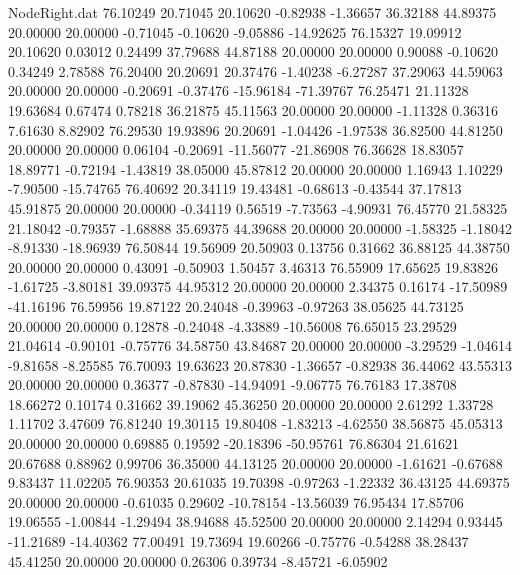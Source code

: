 \begin{filecontents}{NodeRight.dat}
  76.10249   20.71045   20.10620    -0.82938   -1.36657   36.32188   44.89375   20.00000   20.00000   -0.71045   -0.10620   -9.05886  -14.92625
  76.15327   19.09912   20.10620     0.03012    0.24499   37.79688   44.87188   20.00000   20.00000    0.90088   -0.10620    0.34249    2.78588
  76.20400   20.20691   20.37476    -1.40238   -6.27287   37.29063   44.59063   20.00000   20.00000   -0.20691   -0.37476  -15.96184  -71.39767
  76.25471   21.11328   19.63684     0.67474    0.78218   36.21875   45.11563   20.00000   20.00000   -1.11328    0.36316    7.61630    8.82902
  76.29530   19.93896   20.20691    -1.04426   -1.97538   36.82500   44.81250   20.00000   20.00000    0.06104   -0.20691  -11.56077  -21.86908
  76.36628   18.83057   18.89771    -0.72194   -1.43819   38.05000   45.87812   20.00000   20.00000    1.16943    1.10229   -7.90500  -15.74765
  76.40692   20.34119   19.43481    -0.68613   -0.43544   37.17813   45.91875   20.00000   20.00000   -0.34119    0.56519   -7.73563   -4.90931
  76.45770   21.58325   21.18042    -0.79357   -1.68888   35.69375   44.39688   20.00000   20.00000   -1.58325   -1.18042   -8.91330  -18.96939
  76.50844   19.56909   20.50903     0.13756    0.31662   36.88125   44.38750   20.00000   20.00000    0.43091   -0.50903    1.50457    3.46313
  76.55909   17.65625   19.83826    -1.61725   -3.80181   39.09375   44.95312   20.00000   20.00000    2.34375    0.16174  -17.50989  -41.16196
  76.59956   19.87122   20.24048    -0.39963   -0.97263   38.05625   44.73125   20.00000   20.00000    0.12878   -0.24048   -4.33889  -10.56008
  76.65015   23.29529   21.04614    -0.90101   -0.75776   34.58750   43.84687   20.00000   20.00000   -3.29529   -1.04614   -9.81658   -8.25585
  76.70093   19.63623   20.87830    -1.36657   -0.82938   36.44062   43.55313   20.00000   20.00000    0.36377   -0.87830  -14.94091   -9.06775
  76.76183   17.38708   18.66272     0.10174    0.31662   39.19062   45.36250   20.00000   20.00000    2.61292    1.33728    1.11702    3.47609
  76.81240   19.30115   19.80408    -1.83213   -4.62550   38.56875   45.05313   20.00000   20.00000    0.69885    0.19592  -20.18396  -50.95761
  76.86304   21.61621   20.67688     0.88962    0.99706   36.35000   44.13125   20.00000   20.00000   -1.61621   -0.67688    9.83437   11.02205
  76.90353   20.61035   19.70398    -0.97263   -1.22332   36.43125   44.69375   20.00000   20.00000   -0.61035    0.29602  -10.78154  -13.56039
  76.95434   17.85706   19.06555    -1.00844   -1.29494   38.94688   45.52500   20.00000   20.00000    2.14294    0.93445  -11.21689  -14.40362
  77.00491   19.73694   19.60266    -0.75776   -0.54288   38.28437   45.41250   20.00000   20.00000    0.26306    0.39734   -8.45721   -6.05902

\end{filecontents}
